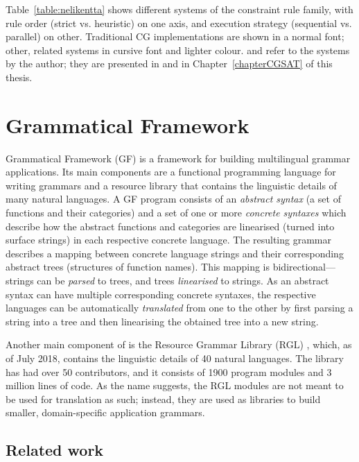 Table~\ref{table:nelikentta} shows different systems of the constraint
rule family, with rule order (strict vs. heuristic) on one axis, and
execution strategy (sequential vs. parallel) on other.  Traditional CG
implementations are shown in a normal font; other, related systems in
cursive font and lighter colour.  \satcgMax and \satcgOrd refer to the
systems by the author; they are presented in
\cite{listenmaa_claessen2015} and in Chapter~\ref{chapterCGSAT} of
this thesis.


\section{Grammatical Framework}
\label{sec:gf-intro}

Grammatical Framework (GF) \cite{ranta2011gfbook} is a framework for
building multilingual grammar applications. Its main components are a
functional programming language for writing grammars and a resource
library that contains the linguistic details of many natural
languages.  A GF program consists of an \emph{abstract syntax} (a set
of functions and their categories) and a set of one or more
\emph{concrete syntaxes} which describe how the abstract functions and
categories are linearised (turned into surface strings) in each
respective concrete language. The resulting grammar describes a
mapping between concrete language strings and their corresponding
abstract trees (structures of function names).  This mapping is
bidirectional---strings can be \emph{parsed} to trees, and trees
\emph{linearised} to strings.  As an abstract syntax can have multiple
corresponding concrete syntaxes, the respective languages can be
automatically \emph{translated} from one to the other by first parsing
a string into a tree and then linearising the obtained tree into a new
string.

Another main component of \gf{} is the Resource Grammar Library (RGL)
\cite{ranta2009rgl}, which, as of July 2018, contains the linguistic
details of 40 natural languages. The library has had over 50
contributors, and it consists of 1900 program modules and 3 million
lines of code. As the name suggests, the RGL modules are not meant to
be used for translation as such; instead, they are used as libraries
to build smaller, domain-specific application grammars.

\subsection{Related work}

